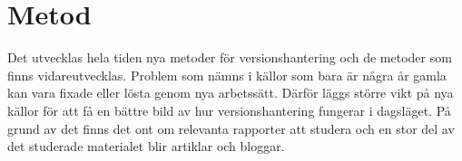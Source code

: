 \section{Metod}
\label{sec:bjorn-method}

Det utvecklas hela tiden nya metoder för versionshantering och de metoder som finns vidareutvecklas. Problem som nämns i källor som bara är några år gamla kan vara fixade eller lösta genom nya arbetssätt. Därför läggs större vikt på nya källor för att få en bättre bild av hur versionshantering fungerar i dagsläget. På grund av det finns det ont om relevanta rapporter att studera och en stor del av det studerade materialet blir artiklar och bloggar.